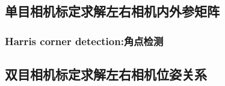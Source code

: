 \documentclass[aspectratio=43]{beamer}
\begin{document}



	\subsection{单目相机标定求解左右相机内外参矩阵}

	\begin{frame}
		\frametitle{Harris corner detection:角点检测}
	\end{frame}



	\subsection{双目相机标定求解左右相机位姿关系}
	
\end{document}
